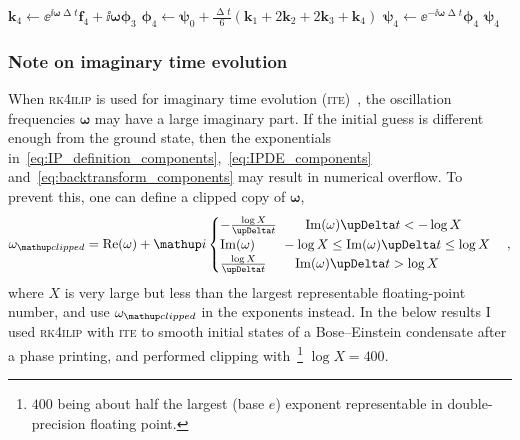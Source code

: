 \begin{breakablealgorithm}
\begin{algorithmic}[1]
        \State $\mathbf{k}_4 \gets \ee^{\ii\mathbf{\omega}\upDelta t}\mathbf{f}_4 + \ii\mathbf{\omega}\mathbf{\phi}_3$
        \State $\mathbf{\phi}_4 \gets
                \mathbf{\psi}_0 + \frac{\upDelta t}{6}\left(\mathbf{k}_1 + 2\mathbf{k}_2 + 2\mathbf{k}_3 + \mathbf{k}_4\right)$
        \State $\mathbf{\psi}_4 \gets \ee^{-\ii\mathbf{\omega}\upDelta t}\mathbf{\phi}_4$
        \State \Return $\mathbf{\psi}_4$
    \EndFunction
    \end{algorithmic}
\end{breakablealgorithm}

\subsubsection{Note on imaginary time evolution}

When \textsc{rk4ilip} is used for imaginary time evolution (\textsc{ite})~\cite{chiofalo2000}, the oscillation frequencies $\mathbf{\omega}$ may have a large imaginary part. If the initial guess is different enough from the ground state, then the exponentials in~\eqref{eq:IP_definition_components},~\eqref{eq:IPDE_components} and~\eqref{eq:backtransform_components} may result in numerical overflow. To prevent this, one can define a clipped copy of $\mathbf{\omega}$,
\begin{align}
\mathbf{\omega}_\up{clipped} = \re(\mathbf{\omega}) + \ii\begin{cases}
-\frac{\log X}{\upDelta t}\qquad \im(\mathbf{\omega})\upDelta t < -\log X\\
\im(\mathbf{\omega})\qquad       -\log X \leq \im(\mathbf{\omega})\upDelta t \leq \log X\\
\frac{\log X}{\upDelta t}\qquad  \im(\mathbf{\omega})\upDelta t > \log X
\end{cases},
\end{align}
where $X$ is very large but less than the largest representable floating-point number, and use $\mathbf{\omega}_\up{clipped}$ in the exponents instead. In the below results I used \textsc{rk4ilip} with \textsc{ite} to smooth initial states of a Bose--Einstein condensate after a phase printing, and performed clipping with~\footnote{$400$ being about half the largest (base $e$) exponent representable in double-precision floating point.} $\log X = 400$.

